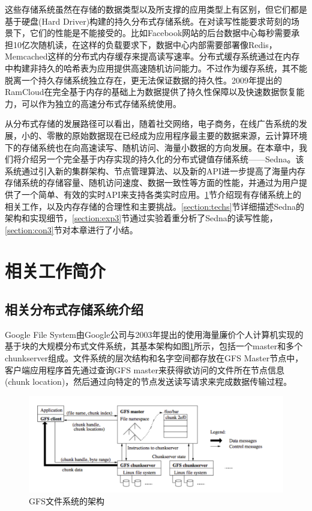 这些存储系统虽然在存储的数据类型以及所支撑的应用类型上有区别，但它们都是基于硬盘(Hard Driver)构建的持久分布式存储系统。在对读写性能要求苛刻的场景下，它们的性能是不能接受的。比如Facebook网站的后台数据中心每秒需要承担10亿次随机读\cite{nishtala2013scaling}，在这样的负载要求下，数据中心内部需要部署像Redis\cite{redis}，Memcached\cite{memcachedproject}这样的分布式内存缓存来提高读写速率。分布式缓存系统通过在内存中构建非持久的哈希表为应用提供高速随机访问能力。不过作为缓存系统，其不能脱离一个持久存储系统独立存在，更无法保证数据的持久性。2009年提出的RamCloud\cite{ousterhout2010case}在完全基于内存的基础上为数据提供了持久性保障以及快速数据恢复能力，可以作为独立的高速分布式存储系统使用。

从分布式存储的发展路径可以看出，随着社交网络，电子商务，在线广告系统的发展，小的、零散的原始数据现在已经成为应用程序最主要的数据来源，云计算环境下的存储系统也在向高速读写、随机访问、海量小数据的方向发展。在本章中，我们将介绍另一个完全基于内存实现的持久化的分布式键值存储系统——Sedna。该系统通过引入新的集群架构、节点管理算法、以及新的API进一步提高了海量内存存储系统的存储容量、随机访问速度、数据一致性等方面的性能，并通过为用户提供了一个简单、有效的实时API来支持各类实时应用。\ref{section:relevant}节介绍现有存储系统上的相关工作，以及内存存储的合理性和主要挑战。\ref{section:techs}节详细描述Sedna的架构和实现细节，\ref{section:exp3}节通过实验着重分析了Sedna的读写性能，\ref{section:con3}节对本章进行了小结。

\section{相关工作简介}
\label{section:relevant}

\subsection{相关分布式存储系统介绍}
Google File System由Google公司与2003年提出的使用海量廉价个人计算机实现的基于块的大规模分布式文件系统，其基本架构如图\ref{fig:gfsarch}所示，包括一个master和多个chunkserver组成。文件系统的层次结构和名字空间都存放在GFS Master节点中，客户端应用程序首先通过查询GFS master来获得欲访问的文件所在节点信息(chunk location)，然后通过向特定的节点发送读写请求来完成数据传输过程。

\begin{figure}[h!]
\centering
\includegraphics[width=6in]{../figures/gfsarch.pdf}
\caption{GFS文件系统的架构}
\label{fig:gfsarch}
\end{figure}

